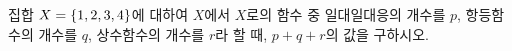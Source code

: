 집합 $X=\{1{,}\mkern3mu\mathopen{}2{,}\mkern3mu\mathopen{}3{,}\mkern3mu\mathopen{}4\}$에 대하여 $X$에서 $X$로의 함수 중 일대일대응의 개수를 $p$, 항등함수의 개수를 $q$, 상수함수의 개수를 $r$라 할 때, $p+q+r$의 값을 구하시오.
